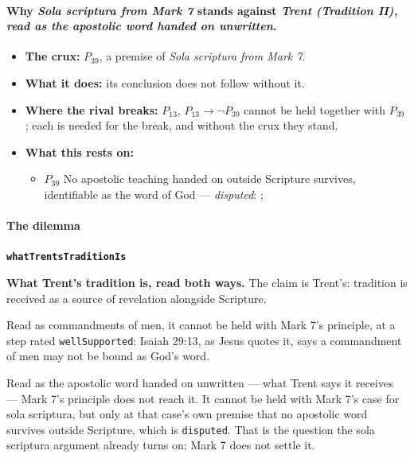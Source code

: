 \documentclass[11pt]{article}
\begin{document}
\paragraph{Why \emph{Sola scriptura from Mark 7} stands against \emph{Trent (Tradition II), read as the apostolic word handed on unwritten}.}
\begin{itemize}
\item \textbf{The crux:} \(P_{39}\), a premise of \emph{Sola scriptura from Mark 7}.
\item \textbf{What it does:} its conclusion does not follow without it.
\item \textbf{Where the rival breaks:} \(P_{13}\), \(P_{13} \rightarrow \lnot P_{39}\) cannot be held together with \(P_{39}\); each is needed for the break, and without the crux they stand.
\item \textbf{What this rests on:}
\begin{itemize}
\item \(P_{39}\) No apostolic teaching handed on outside Scripture survives, identifiable as the word of God --- \emph{disputed}: \cite[506]{whitaker-disputation-1849}; \cite[I.6]{westminster-confession-1647}
\end{itemize}
\end{itemize}
\paragraph*{The dilemma}
\leavevmode\par
\par\medskip\noindent\textbf{\texttt{what\allowbreak{}Trents\allowbreak{}Tradition\allowbreak{}Is}}\par\nobreak\noindent
\textbf{What Trent's tradition is, read both ways.} The claim is Trent's: tradition is received as a source of revelation alongside Scripture.

Read as commandments of men, it cannot be held with Mark 7's principle, at a step rated \texttt{well\allowbreak{}Supported}: Isaiah 29:13, as Jesus quotes it, says a commandment of men may not be bound as God's word.

Read as the apostolic word handed on unwritten — what Trent says it receives — Mark 7's principle does not reach it. It cannot be held with Mark 7's case for sola scriptura, but only at that case's own premise that no apostolic word survives outside Scripture, which is \texttt{disputed}. That is the question the sola scriptura argument already turns on; Mark 7 does not settle it.
\end{document}
